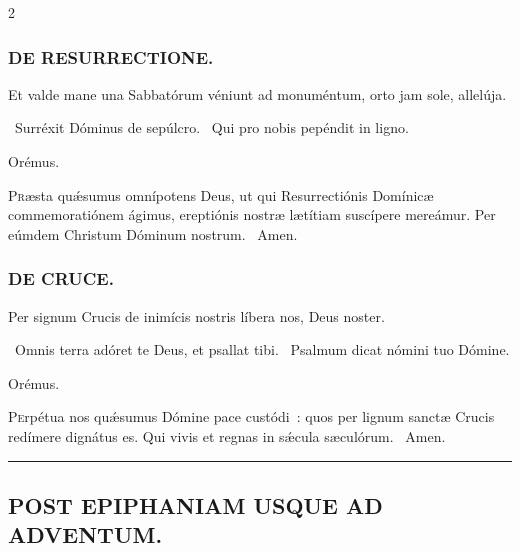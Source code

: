 \documentclass[9pt,twoside]{extarticle}
\begin{document}
\begin{multicols}{2}
{{{\subsubsection*{\center \textsc{DE RESURRECTIONE.}}
\begin{tightlist}{}
\item {}
\item {} Et valde mane una Sabbatórum véniunt ad monuméntum, orto jam sole, allelúja.
\item {}~Surréxit Dóminus de sepúlcro. ~Qui pro nobis pepéndit in ligno.
\item Orémus. \hfill {}
\end{tightlist}
\lettrine{P}ræsta quǽsumus omnípotens Deus, ut qui Resurrectiónis Domínicæ commemoratiónem ágimus, ereptiónis nostræ lætítiam suscípere mereámur. Per eúmdem Christum Dóminum nostrum. ~Amen.

\subsubsection*{\center \textsc{DE CRUCE.}}
\begin{tightlist}{}
\item {}
\item {} Per signum Crucis de inimícis nostris líbera nos, Deus noster.
\item {}~Omnis terra adóret te Deus, et psallat tibi. ~Psalmum dicat nómini tuo Dómine.
\item Orémus. \hfill {}
\end{tightlist}
\lettrine{P}erpétua nos quǽsumus Dómine pace custódi~: quos per lignum sanctæ Crucis redímere dignátus es. Qui vivis et regnas in sǽcula sæculórum. ~Amen.

\begin{center}\textcolor{red}{\rule{\linewidth}{0.5pt}} \end{center}

\subsection*{\center \textsc{POST EPIPHANIAM USQUE AD ADVENTUM.}}
\begin{tightlist}{}
\item {}
\end{tightlist}

}}}
\end{multicols}
\end{document}
